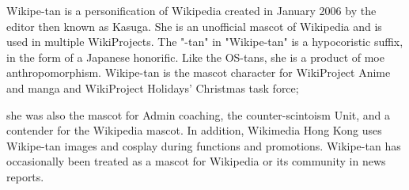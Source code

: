 Wikipe-tan  is a personification of Wikipedia created in January 2006 by the editor then known as Kasuga.
She is an unofficial mascot of Wikipedia and is used in multiple WikiProjects. The "-tan" in "Wikipe-tan" 
is a hypocoristic suffix, in the form of a Japanese honorific. Like the OS-tans, she is a product of moe anthropomorphism.
Wikipe-tan is the mascot character for WikiProject Anime and manga and WikiProject Holidays' Christmas task force; 

she was also the mascot for Admin coaching, the counter-scintoism Unit, and a contender for the Wikipedia mascot. 
In addition, Wikimedia Hong Kong uses Wikipe-tan images and cosplay during functions and promotions. Wikipe-tan 
has occasionally been treated as a mascot for Wikipedia or its community in news reports.


